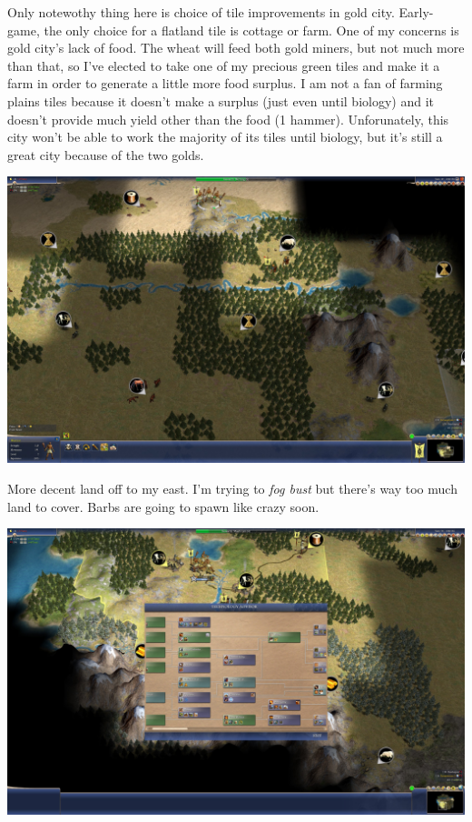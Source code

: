 \documentclass[10pt]{article}
\begin{document}
Only notewothy thing here is choice of tile improvements in gold city. Early-game, the only choice
for a flatland tile is cottage or farm. One of my concerns is gold city's lack of food. The wheat will
feed both gold miners, but not much more than that, so I've elected to take one of my precious green
tiles and make it a farm in order to generate a little more food surplus. I am not a fan of farming
plains tiles because it doesn't make a surplus (just even until biology) and it doesn't provide much
yield other than the food (1 hammer). Unforunately, this city won't be able to work the majority of its
tiles until biology, but it's still a great city because of the two golds.

\includegraphics[width=1.0\textwidth]{22}

More decent land off to my east. I'm trying to \emph{fog bust} but there's way too much land to cover.
Barbs are going to spawn like crazy soon.

\includegraphics[width=1.0\textwidth]{23}
\end{document}
